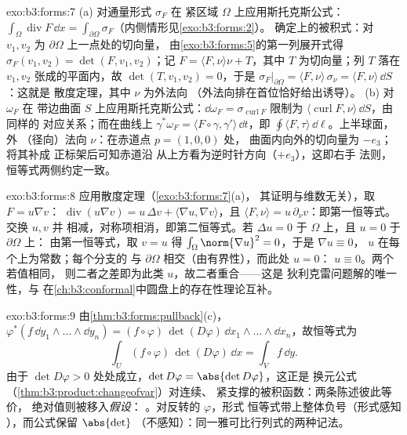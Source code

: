 \begin{solution}{exo:b3:forms:7}
(a) 对通量形式 $\sigma_F$ 在
紧区域 $\Omega$ 上应用斯托克斯公式：
$\int_\Omega\operatorname{div}F\,\dd x =
\int_{\partial\Omega}\sigma_F$（内侧情形见\cref{exo:b3:forms:2}）。
确定上的被积式：对
$v_1, v_2$ 为 $\partial\Omega$ 上一点处的切向量，
由\cref{exo:b3:forms:5}的第一列展开式得
$\sigma_F(v_1, v_2) = \det(F, v_1, v_2)$；记 $F =
\langle F, \nu\rangle\nu + T$，其中 $T$ 为切向量；列
$T$ 落在 $v_1, v_2$ 张成的平面内，故 $\det(T,
v_1, v_2) = 0$，于是
$\sigma_F\vert_{\partial\Omega} = \langle F,
\nu\rangle\,\sigma_\nu = \langle F, \nu\rangle\,\dd S$：这就是
散度定理，其中 $\nu$ 为外法向
（外法向排在首位恰好给出诱导）。
(b) 对 $\omega_F$ 在
带边曲面 $S$ 上应用斯托克斯公式：$\dd\omega_F =
\sigma_{\operatorname{curl}F}$ 限制为
$\langle\operatorname{curl}F, \nu\rangle\,\dd S$，由同样的
对应关系；而在曲线上
$\gamma^*\omega_F = \langle F\circ\gamma,
\gamma'\rangle\,\dd t$，即 $\oint\langle F,
\tau\rangle\,\dd\ell$。上半球面，外
（径向）法向 $\nu$：在赤道点 $p = (1,0,0)$ 处，
曲面内向外的切向量为 $-e_3$；将其补成
正标架后可知赤道沿
从上方看为逆时针方向（$+e_3$），这即右手
法则，恒等式两侧约定一致。
\end{solution}

\begin{solution}{exo:b3:forms:8}
应用散度定理（\cref{exo:b3:forms:7}(a)，
其证明与维数无关），取 $F = u\nabla v$：
$\operatorname{div}(u\nabla v) = u\,\Delta v + \langle\nabla
u, \nabla v\rangle$，且 $\langle F, \nu\rangle =
u\,\partial_\nu v$：即第一恒等式。交换 $u, v$ 并
相减，对称项相消，即第二恒等式。若
$\Delta u = 0$ 于 $\Omega$ 上，且 $u = 0$ 于 $\partial\Omega$ 上：
由第一恒等式，取 $v = u$ 得
$\int_\Omega\norm{\nabla u}^2 = 0$，于是 $\nabla u \equiv 0$，
$u$ 在每个上为常数；每个分支的
与 $\partial\Omega$ 相交（由有界性），而此处 $u = 0$：
$u \equiv 0$。两个若值相同，
则二者之差即为此类 $u$，故二者重合——这是
狄利克雷问题解的唯一性，与
在\cref{ch:b3:conformal}中圆盘上的存在性理论互补。
\end{solution}

\begin{solution}{exo:b3:forms:9}
由\cref{thm:b3:forms:pullback}(c)，
$\varphi^*(f\,\dd y_1\wedge\dots\wedge\dd y_n) =
(f\circ\varphi)\,\det(D\varphi)\,\dd
x_1\wedge\dots\wedge\dd x_n$，故恒等式为
\[
\int_U(f\circ\varphi)\,\det(D\varphi)\,\dd x = \int_Vf\,\dd
y .
\]
由于 $\det D\varphi > 0$ 处处成立，$\det D\varphi =
\abs{\det D\varphi}$，这正是
换元公式
（\cref{thm:b3:product:changeofvar}）对连续、
紧支撑的被积函数：两条陈述彼此等价，
绝对值则被移入\emph{假设}：
。对反转的 $\varphi$，形式
恒等式带上整体负号（形式感知
），而公式保留 $\abs{\det}$
（不感知）：同一雅可比行列式的两种记法。
\end{solution}

